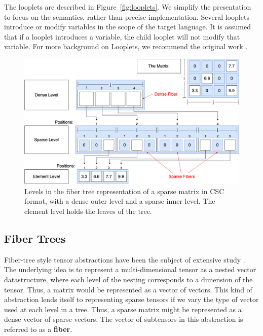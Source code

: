 The looplets are described in Figure~\ref{fig:looplets}. We simplify the presentation to focus on the semantics, rather than precise implementation. Several looplets introduce or modify variables in the scope of the target language. It is assumed that if a looplet introduces a variable, the child looplet will not modify that variable. For more background on Looplets, we recommend the original work \cite{ahrens_looplets_2023}. 

\begin{figure}
    \centering
    \vspace{-28pt}
    \includegraphics[width=\linewidth]{LevelsVsFibers-matrix.png}
    \vspace{-16pt}
    \caption{Levels in the fiber tree representation of a sparse matrix in CSC format, with a dense outer level and a sparse inner level. The element level holds the leaves of the tree.}
    \label{fig:levelsvsfibers}
    \vspace{-24pt}
\end{figure}
\subsection{Fiber Trees}

Fiber-tree style tensor abstractions have been the subject of extensive study
\cite{sze2017efficient, chou2022compilation, chou2018format}.  The underlying
idea is to represent a multi-dimensional tensor as a nested vector
datastructure, where each level of the nesting corresponds to a dimension of the
tensor. Thus, a matrix would be represented as a vector of vectors. This kind of
abstraction lends itself to representing sparse tensors if we vary the type of
vector used at each level in a tree. Thus, a sparse matrix might be represented
as a dense vector of sparse vectors. The vector of subtensors in this
abstraction is referred to as a \textbf{fiber}.

